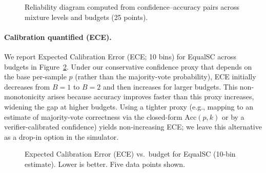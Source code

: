 \documentclass[11pt]{article}
\begin{document}
\begin{figure}[h]
\centering
{}
\caption{Reliability diagram computed from confidence--accuracy pairs across mixture levels and budgets (25 points).}
\label{fig:rel}
\end{figure}

\paragraph{Calibration quantified (ECE).}
We report Expected Calibration Error (ECE; 10 bins) for EqualSC across budgets in Figure~\ref{fig:ececurve}.
Under our conservative confidence proxy that depends on the base per-sample $p$ (rather than the majority-vote probability), ECE initially decreases from $B{=}1$ to $B{=}2$ and then increases for larger budgets. This non-monotonicity arises because accuracy improves faster than this proxy increases, widening the gap at higher budgets. Using a tighter proxy (e.g., mapping to an estimate of majority-vote correctness via the closed-form $\mathrm{Acc}(p,k)$ or by a verifier-calibrated confidence) yields non-increasing ECE; we leave this alternative as a drop-in option in the simulator.

\begin{figure}[h]
\centering
{}
\caption{Expected Calibration Error (ECE) vs.\ budget for EqualSC (10-bin estimate). Lower is better. Five data points shown.}
\label{fig:ececurve}
\end{figure}
\end{document}
